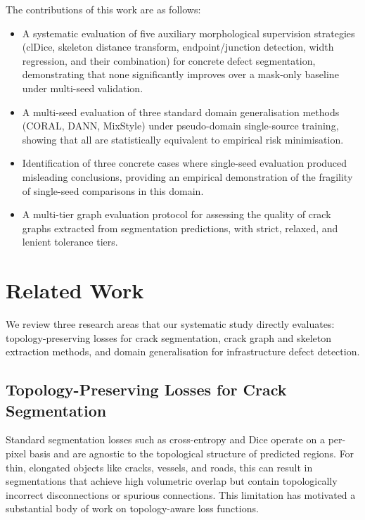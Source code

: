 \documentclass[preprint,12pt]{elsarticle}
\begin{document}
The contributions of this work are as follows:
\begin{itemize}
    \item A systematic evaluation of five auxiliary morphological supervision strategies (clDice, skeleton distance transform, endpoint/junction detection, width regression, and their combination) for concrete defect segmentation, demonstrating that none significantly improves over a mask-only baseline under multi-seed validation.
    \item A multi-seed evaluation of three standard domain generalisation methods (CORAL, DANN, MixStyle) under pseudo-domain single-source training, showing that all are statistically equivalent to empirical risk minimisation.
    \item Identification of three concrete cases where single-seed evaluation produced misleading conclusions, providing an empirical demonstration of the fragility of single-seed comparisons in this domain.
    \item A multi-tier graph evaluation protocol for assessing the quality of crack graphs extracted from segmentation predictions, with strict, relaxed, and lenient tolerance tiers.
\end{itemize}



\section{Related Work}
\label{sec:related_work}

We review three research areas that our systematic study directly evaluates: topology-preserving losses for crack segmentation, crack graph and skeleton extraction methods, and domain generalisation for infrastructure defect detection.

\subsection{Topology-Preserving Losses for Crack Segmentation}
\label{sec:rw_topology}

Standard segmentation losses such as cross-entropy and Dice operate on a per-pixel basis and are agnostic to the topological structure of predicted regions. For thin, elongated objects like cracks, vessels, and roads, this can result in segmentations that achieve high volumetric overlap but contain topologically incorrect disconnections or spurious connections. This limitation has motivated a substantial body of work on topology-aware loss functions.
\end{document}
